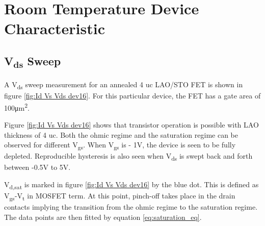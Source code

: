 \documentclass[11pt,a4paper]{report}
\begin{document}
\section{Room Temperature Device Characteristic}





\subsection{V\textsubscript{ds} Sweep}
A V\textsubscript{ds} sweep measurement for an annealed 4 uc LAO/STO FET is shown in figure \ref{fig:Id Vs Vds dev16}. For this particular device, the FET has a gate area of 100\si{\micro m^{2}}.

Figure \ref{fig:Id Vs Vds dev16} shows that transistor operation is possible with LAO thickness of 4 uc. Both the ohmic regime and the saturation regime can be observed for different V\textsubscript{gs}. When V\textsubscript{gs} is - 1V, the device is seen to be fully depleted. Reproducible hysteresis is also seen when V\textsubscript{ds} is swept back and forth between -0.5V to 5V. 

V\textsubscript{d,sat} is marked in figure \ref{fig:Id Vs Vds dev16} by the blue dot. This is defined as V\textsubscript{gs}-V\textsubscript{t} in MOSFET term. At this point, pinch-off takes place in the drain contacts implying the transition from the ohmic regime to the saturation regime. The data points are then fitted by equation \ref{eq:saturation_eq}.
\end{document}
